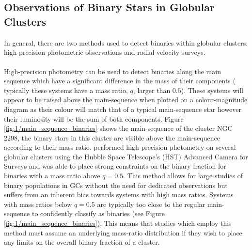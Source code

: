 \subsection{Observations of Binary Stars in Globular Clusters}

\paragraph{}
In general, there are two methods used to detect binaries within globular clusters: high-precision
photometric observations and radial velocity surveys.

\paragraph{}
High-precision photometry can be used to detect binaries along the main sequence which have a
significant difference in the mass of their components ( typically these systems have a mass ratio,
$q$, larger than $0.5$). These systems will appear to be raised above the main-sequence when plotted
on a colour-magnitude diagram as their colour will match that of a typical main-sequence star
however their luminosity will be the sum of both components. Figure
\ref{fig:1/main_sequence_binaries} shows the main-sequence of the cluster NGC 2298, the binary stars
in this cluster are visible above the main-sequence according to their mass ratio.
\citet{Milone2012} performed high-precision photometry on several globular clusters using the Hubble
Space Telescope's (HST) Advanced Camera for Surveys and was able to place strong constraints on the
binary fraction for binaries with a mass ratio above $q=0.5$. This method allows for large studies
of binary populations in GCs without the need for dedicated observations but suffers from an
inherent bias towards systems with high mass ratios. Systems with mass ratios below $q=0.5$ are
typically too close to the regular main-sequence to confidently classify as binaries (see Figure
\ref{fig:1/main_sequence_binaries}). This means that studies which employ this method must assume an
underlying mass-ratio distribution if they wish to place any limits on the overall binary fraction
of a cluster.


